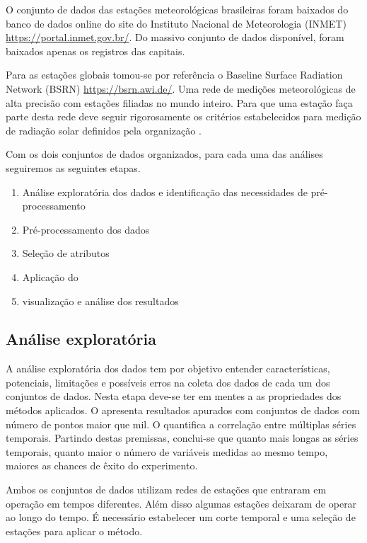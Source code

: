 
O conjunto de dados das estações meteorológicas brasileiras foram baixados do banco de dados online do site do Instituto Nacional de Meteorologia (INMET) \url{https://portal.inmet.gov.br/}. Do massivo conjunto de dados disponível, foram baixados apenas os registros das capitais.

Para as estações globais tomou-se por referência o Baseline Surface Radiation Network (BSRN) \url{https://bsrn.awi.de/}. Uma rede de medições meteorológicas de alta precisão com estações filiadas no mundo inteiro. Para que uma estação faça parte desta rede deve seguir rigorosamente os critérios estabelecidos para medição de radiação solar definidos pela organização \cite{Salazar2020}.

Com os dois conjuntos de dados organizados, para cada uma das análises seguiremos as seguintes etapas.

\begin{enumerate}
    \item Análise exploratória dos dados e identificação das necessidades de pré-processamento
    \item Pré-processamento dos dados
    \item Seleção de atributos
    \item Aplicação do \dmc
    \item visualização e análise dos resultados
\end{enumerate}

\subsection{Análise exploratória}

A análise exploratória dos dados tem por objetivo entender características, potenciais, limitações e possíveis erros na coleta dos dados de cada um dos conjuntos de dados. Nesta etapa deve-se ter em mentes a as propriedades dos métodos aplicados. O \pdcca apresenta resultados apurados com conjuntos de dados com número de pontos maior que mil. O \dmc quantifica a correlação entre múltiplas séries temporais. Partindo destas premissas, conclui-se que quanto mais longas as séries temporais, quanto maior o número de variáveis medidas ao mesmo tempo, maiores as chances de êxito do experimento.

Ambos os conjuntos de dados utilizam redes de estações que entraram em operação em tempos diferentes. Além disso algumas estações deixaram de operar ao longo do tempo. É necessário estabelecer um corte temporal e uma seleção de estações para aplicar o método.


